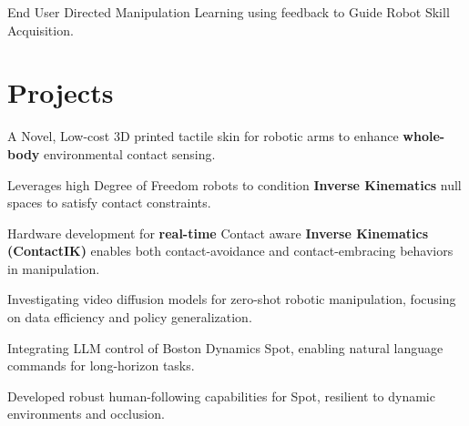 \documentclass[]{deedy-resume-reversed}
\renewcommand{\sectionsep}{\vspace{1.0em}}
\begin{document}
\begin{minipage}[t]{0.62\textwidth}
\begin{tightemize}
\item End User Directed Manipulation Learning using feedback to Guide Robot Skill Acquisition.
\end{tightemize}
\sectionsep


\section{Projects}
\begin{tightemize}
\item A Novel, Low-cost 3D printed tactile skin for robotic arms to enhance \textbf{whole-body} environmental contact sensing.
\item Leverages high Degree of Freedom robots to condition \textbf{Inverse Kinematics} null spaces to satisfy contact constraints.
\item Hardware development for \textbf{real-time} Contact aware \textbf{Inverse Kinematics (ContactIK)} enables both contact-avoidance and contact-embracing behaviors in manipulation.
\end{tightemize}
\sectionsep


\begin{tightemize}
\item Investigating video diffusion models for zero-shot robotic manipulation, focusing on data efficiency and policy generalization.
\end{tightemize}
\sectionsep


\begin{tightemize}
\item Integrating LLM control of Boston Dynamics Spot, enabling natural language commands for long-horizon tasks.
\item Developed robust human-following capabilities for Spot, resilient to dynamic environments and occlusion.
\end{tightemize}


\end{minipage}
\end{document}

